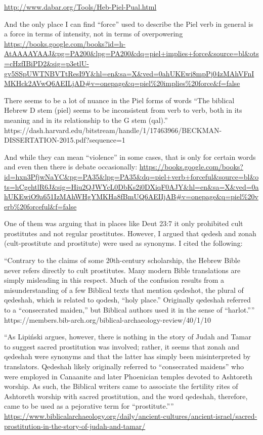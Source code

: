 \documentclass[11pt]{article}
\begin{document}
{\url{http://www.dabar.org/Tools/Heb-Piel-Pual.html}

And the only place I can find “force” used to describe the Piel verb in general is a force in terms of intensity, not in terms of overpowering
\url{https://books.google.com/books?id=h-AtAAAAYAAJ&pg=PA200&lpg=PA200&dq=piel+implies+force&source=bl&ots=cHzfIBiPD2&sig=p3etlU-gv5SSpUWTNBVTtResI9Y&hl=en&sa=X&ved=0ahUKEwi8mpPj04zMAhVFnIMKHck2AVwQ6AEILjAD#v=onepage&q=piel%20implies%20force&f=false}

There seems to be a lot of nuance in the Piel forms of words
“The biblical Hebrew D stem (piel) seems to be inconsistent from verb to verb, both in its meaning and in its relationship to the G stem (qal).”
https://dash.harvard.edu/bitstream/handle/1/17463966/BECKMAN-DISSERTATION-2015.pdf?sequence=1

And while they can mean “violence” in some cases, that is only for certain words and even then there is debate occasionally:
\url{https://books.google.com/books?id=hxn3PfjwNaYC&pg=PA35&lpg=PA35&dq=piel+verb+forceful&source=bl&ots=hCgehtlR6J&sig=Hiu2QJWYcL0DbKs2i0DXiqF0AJY&hl=en&sa=X&ved=0ahUKEwiO9a651IzMAhWHgYMKHa8fBmUQ6AEIIjAB#v=onepage&q=piel%20verb%20forceful&f=false}

One of them was arguing that in places like Deut 23:7 it only prohibited cult prostitutes and not regular prostitutes. However, I argued that qedesh and zonah (cult-prostitute and prostitute) were used as synonyms. I cited the following:

“Contrary to the claims of some 20th-century scholarship, the Hebrew Bible never refers directly to cult prostitutes. Many modern Bible translations are simply misleading in this respect. Much of the confusion results from a misunderstanding of a few Biblical texts that mention qedeshot, the plural of qedeshah, which is related to qodesh, “holy place.” Originally qedeshah referred to a “consecrated maiden,” but Biblical authors used it in the sense of “harlot.””
https://members.bib-arch.org/biblical-archaeology-review/40/1/10

“As Lipiński argues, however, there is nothing in the story of Judah and Tamar to suggest sacred prostitution was involved; rather, it seems that zonah and qedeshah were synonyms and that the latter has simply been misinterpreted by translators.
Qedeshah likely originally referred to “consecrated maidens” who were employed in Canaanite and later Phoenician temples devoted to Ashtoreth worship. As such, the Biblical writers came to associate the fertility rites of Ashtoreth worship with sacred prostitution, and the word qedeshah, therefore, came to be used as a pejorative term for “prostitute.””
\url{https://www.biblicalarchaeology.org/daily/ancient-cultures/ancient-israel/sacred-prostitution-in-the-story-of-judah-and-tamar/}

}
\end{document}

